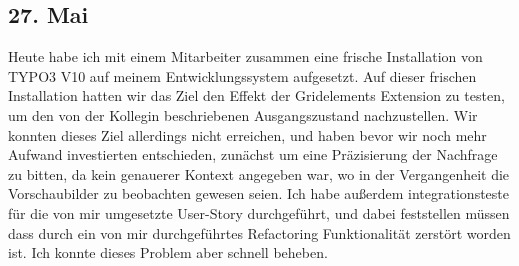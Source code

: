 \subsection{27. Mai}
Heute habe ich mit einem Mitarbeiter zusammen eine frische Installation von TYPO3 V10 auf meinem Entwicklungssystem aufgesetzt. Auf dieser frischen Installation hatten wir das Ziel den Effekt der Gridelements Extension zu testen, um den von der Kollegin beschriebenen Ausgangszustand nachzustellen. Wir konnten dieses Ziel allerdings nicht erreichen, und haben bevor wir noch mehr Aufwand investierten entschieden, zunächst um eine Präzisierung der Nachfrage zu bitten, da kein genauerer Kontext angegeben war, wo in der Vergangenheit die Vorschaubilder zu beobachten gewesen seien.
Ich habe außerdem integrationsteste für die von mir umgesetzte User-Story durchgeführt, und dabei feststellen müssen dass durch ein von mir durchgeführtes Refactoring Funktionalität zerstört worden ist. Ich konnte dieses Problem aber schnell beheben.